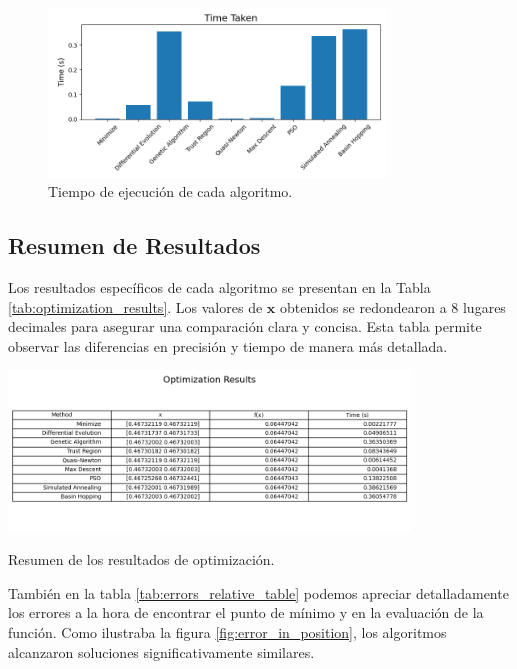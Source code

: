 \documentclass[fontsize=10pt]{article}
\begin{document}
\begin{figure}[h!]
    \centering
    \includegraphics[width=0.8\textwidth]{images/time_taken.png}
    \caption{Tiempo de ejecución de cada algoritmo.}
    \label{fig:time_taken}
\end{figure}

\subsection{Resumen de Resultados}

Los resultados específicos de cada algoritmo se 
presentan en la Tabla \ref{tab:optimization_results}. 
Los valores de \( \mathbf{x} \) obtenidos se 
redondearon a 8 lugares decimales para asegurar una 
comparación clara y concisa. Esta tabla permite 
observar las diferencias en precisión y tiempo de 
manera más detallada.\\

\begin{table}[h!]
    \centering
    \includegraphics[width=0.8\textwidth]{images/optimization_results.png}
    \caption{Resumen de los resultados de optimización.}
    \label{tab:optimization_results}
\end{table}

También en la tabla \ref{tab:errors_relative_table} 
podemos apreciar detalladamente los errores a la hora 
de encontrar el punto de mínimo y en la evaluación de 
la función. Como ilustraba la figura 
\ref{fig:error_in_position}, los algoritmos alcanzaron 
soluciones significativamente similares.
\end{document}
